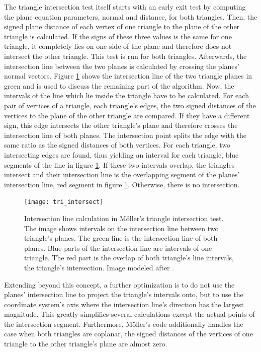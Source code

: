 The triangle intersection test itself starts with an early exit test by computing the plane equation parameters, \ie normal and distance, for both triangles.
Then, the signed plane distance of each vertex of one triangle to the plane of the other triangle is calculated.
If the signs of these three values is the same for one triangle, it completely lies on one side of the plane and therefore does not intersect the other triangle.
This test is run for both triangles.
Afterwards, the intersection line between the two planes is calculated by crossing the planes' normal vectors.
Figure \ref{fig:tri_intersect} shows the intersection line of the two triangle planes in green and is used to discuss the remaining part of the algorithm.
Now, the intervals of the line which lie inside the triangle have to be calculated.
For each pair of vertices of a triangle, \ie each triangle's edges, the two signed distances of the vertices to the plane of the other triangle are compared.
If they have a different sign, this edge intersects the other triangle's plane and therefore crosses the intersection line of both planes.
The intersection point splits the edge with the same ratio as the signed distances of both vertices.
For each triangle, two intersecting edges are found, thus yielding an interval for each triangle, \cf blue segments of the line in figure \ref{fig:tri_intersect}.
If these two intervals overlap, the triangles intersect and their intersection line is the overlapping segment of the planes' intersection line, \cf red segment in figure \ref{fig:tri_intersect}.
Otherwise, there is no intersection.

\begin{figure}
	\centering
	\texttt{[image: tri\_intersect]}
	\caption{
		Intersection line calculation in Möller's triangle intersection test.
		The image shows intervals on the intersection line between two triangle's planes.
		The green line is the intersection line of both planes.
		Blue parts of the intersection line are intervals of one triangle.
		The red part is the overlap of both triangle's line intervals, \ie the triangle's intersection.
		Image modeled after \cite[p757]{tri_tri_intersection_moller_image}.
	}
	\label{fig:tri_intersect}
\end{figure}

Extending beyond this concept, a further optimization is to do not use the planes' intersection line to project the triangle's intervals onto, but to use the coordinate system's axis where the intersection line's direction has the largest magnitude.
This greatly simplifies several calculations except the actual points of the intersection segment.
Furthermore, Möller's code additionally handles the case when both triangles are coplanar, \ie the signed distances of the vertices of one triangle to the other triangle's plane are almost zero.



